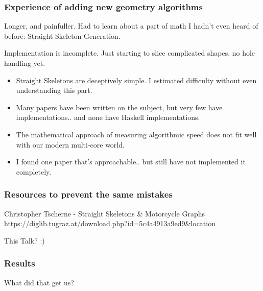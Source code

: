 \documentclass[hyperref={pdfpagemode=FullScreen},aspectratio=169]{beamer}
\begin{document}
\begin{frame}
  \frametitle{Experience of adding new geometry algorithms}
  Longer, and painfuller. Had to learn about a part of math I hadn't even heard of before: Straight Skeleton Generation.\par
  Implementation is incomplete. Just starting to slice complicated shapes, no hole handling yet.
  \begin{itemize}
  \item Straight Skeletons are deceptively simple. I estimated difficulty without even understanding this part.
  \item Many papers have been written on the subject, but very few have implementations.. and none have Haskell implementations.
  \item The mathematical approach of measuring algorithmic speed does not fit well with our modern multi-core world.
  \item I found one paper that's approachable.. but still have not implemented it completely.
  \end{itemize}
\end{frame}

\begin{frame}
  \frametitle{Resources to prevent the same mistakes}
    \begin{block}{Christopher Tscherne - Straight Skeletons \& Motorcycle Graphs}
      https://diglib.tugraz.at/download.php?id=5c4a4913a9ed9\&location
    \end{block}
    This Talk? :)
\end{frame}

\begin{frame}
  \frametitle{Results}
  \Huge{\centerline{What did that get us?}}
\end{frame}
\end{document}
